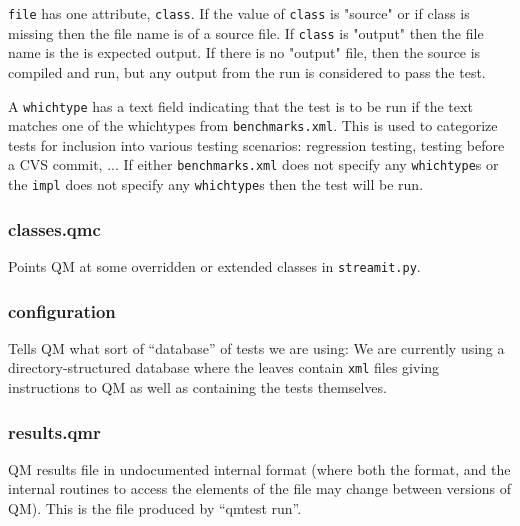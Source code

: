 \documentclass[11pt]{article}
\begin{document}
{\tt file} has one attribute, {\tt class}.  If the value of {\tt class}
is "source" or if class is missing then the file name is of a source
file.  If {\tt class} is "output" then the file name is the is expected
output.  If there is no "output" file, then the source is compiled and
run, but any output from the run is considered to pass the test.


A {\tt whichtype} has a text field indicating that the test is to be run
if the text matches one of the whichtypes from {\tt benchmarks.xml}.
This is used to categorize tests for inclusion into various testing
scenarios: regression testing, testing before a CVS commit, ... 
If either {\tt benchmarks.xml} does not specify any {\tt whichtype}s
or the {\tt impl} does not specify any {\tt whichtype}s then the test
will be run.

\subsubsection{classes.qmc}
Points QM at some overridden or extended classes in {\tt streamit.py}.

\subsubsection{configuration}
Tells QM what sort of ``database'' of tests we are using:  We are currently
using a directory-structured database where the leaves contain {\tt  xml} 
files giving instructions to QM as well as containing the tests themselves.

\subsubsection{results.qmr}
QM results file in undocumented internal format (where both the
format, and the internal routines to access the elements of the file
may change between versions of QM).  This is the file produced by
``qmtest run''.
\end{document}
